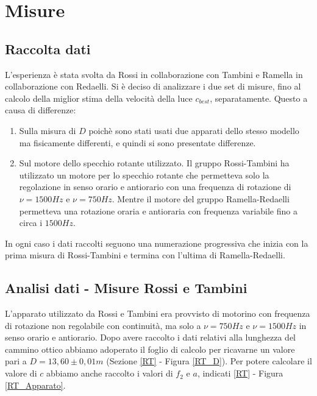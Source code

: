 \documentclass{article}
\begin{document}

\section{Misure}

\subsection{Raccolta dati}
L'esperienza è stata svolta da Rossi in collaborazione con Tambini e Ramella in collaborazione con Redaelli. Si è deciso di analizzare i due set di misure, fino al calcolo 
della miglior stima della velocità della luce $c_{best}$, separatamente. Questo a causa di differenze:

\begin{enumerate}
    \item Sulla misura di $D$ poichè sono stati usati due apparati dello stesso modello ma fisicamente differenti, e quindi si sono presentate differenze.
    \item Sul motore dello specchio rotante utilizzato. Il gruppo Rossi-Tambini ha utilizzato un motore per lo specchio rotante che permetteva solo la regolazione in 
            senso orario e antiorario con una frequenza di rotazione di $\nu = 1500 Hz$ e $\nu = 750 Hz$. Mentre il motore del gruppo Ramella-Redaelli permetteva una rotazione
            oraria e antioraria con frequenza variabile fino a circa i $1500 Hz$.
\end{enumerate}

In ogni caso i dati raccolti seguono una numerazione progressiva che inizia con la prima misura di Rossi-Tambini e termina con l'ultima di Ramella-Redaelli.

\subsection{Analisi dati - Misure Rossi e Tambini} \label{DataAnalysis_RT}

L'apparato utilizzato da Rossi e Tambini era provvisto di motorino con frequenza di rotazione non regolabile con continuità, ma solo a $\nu=750Hz$ e $\nu=1500Hz$
in senso orario e antiorario. Dopo avere raccolto i dati relativi alla lunghezza del cammino ottico abbiamo adoperato il foglio di calcolo per ricavarne un valore pari 
a $D = 13,60 \pm 0,01 m$ (Sezione \ref{RT} - Figura \ref{RT_D}). Per potere calcolare il valore di $c$ abbiamo anche raccolto i valori di $f_2$ e $a$, indicati
\ref{RT} - Figura \ref{RT_Apparato}.
\end{document}
